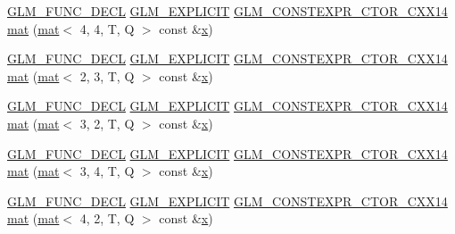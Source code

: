 \begin{DoxyCompactItemize}
\item 
\hyperlink{setup_8hpp_ab2d052de21a70539923e9bcbf6e83a51}{G\+L\+M\+\_\+\+F\+U\+N\+C\+\_\+\+D\+E\+CL} \hyperlink{setup_8hpp_a6c74f5a5e7b134ab69023ff9a30d4d5d}{G\+L\+M\+\_\+\+E\+X\+P\+L\+I\+C\+IT} \hyperlink{setup_8hpp_a0900f9145e68bf6061b6f5e7be3fa751}{G\+L\+M\+\_\+\+C\+O\+N\+S\+T\+E\+X\+P\+R\+\_\+\+C\+T\+O\+R\+\_\+\+C\+X\+X14} \hyperlink{structglm_1_1mat_3_012_00_014_00_01_t_00_01_q_01_4_a384e7c80499cdb6723c512a5cc7fef8d}{mat} (\hyperlink{structglm_1_1mat}{mat}$<$ 4, 4, T, Q $>$ const \&\hyperlink{_s_d_l__opengl_8h_ad0e63d0edcdbd3d79554076bf309fd47}{x})
\item 
\hyperlink{setup_8hpp_ab2d052de21a70539923e9bcbf6e83a51}{G\+L\+M\+\_\+\+F\+U\+N\+C\+\_\+\+D\+E\+CL} \hyperlink{setup_8hpp_a6c74f5a5e7b134ab69023ff9a30d4d5d}{G\+L\+M\+\_\+\+E\+X\+P\+L\+I\+C\+IT} \hyperlink{setup_8hpp_a0900f9145e68bf6061b6f5e7be3fa751}{G\+L\+M\+\_\+\+C\+O\+N\+S\+T\+E\+X\+P\+R\+\_\+\+C\+T\+O\+R\+\_\+\+C\+X\+X14} \hyperlink{structglm_1_1mat_3_012_00_014_00_01_t_00_01_q_01_4_aa1301eedf68cdda9f6f21e81d6fde7c0}{mat} (\hyperlink{structglm_1_1mat}{mat}$<$ 2, 3, T, Q $>$ const \&\hyperlink{_s_d_l__opengl_8h_ad0e63d0edcdbd3d79554076bf309fd47}{x})
\item 
\hyperlink{setup_8hpp_ab2d052de21a70539923e9bcbf6e83a51}{G\+L\+M\+\_\+\+F\+U\+N\+C\+\_\+\+D\+E\+CL} \hyperlink{setup_8hpp_a6c74f5a5e7b134ab69023ff9a30d4d5d}{G\+L\+M\+\_\+\+E\+X\+P\+L\+I\+C\+IT} \hyperlink{setup_8hpp_a0900f9145e68bf6061b6f5e7be3fa751}{G\+L\+M\+\_\+\+C\+O\+N\+S\+T\+E\+X\+P\+R\+\_\+\+C\+T\+O\+R\+\_\+\+C\+X\+X14} \hyperlink{structglm_1_1mat_3_012_00_014_00_01_t_00_01_q_01_4_a2a0d716cec87a87b5009e05f0f448633}{mat} (\hyperlink{structglm_1_1mat}{mat}$<$ 3, 2, T, Q $>$ const \&\hyperlink{_s_d_l__opengl_8h_ad0e63d0edcdbd3d79554076bf309fd47}{x})
\item 
\hyperlink{setup_8hpp_ab2d052de21a70539923e9bcbf6e83a51}{G\+L\+M\+\_\+\+F\+U\+N\+C\+\_\+\+D\+E\+CL} \hyperlink{setup_8hpp_a6c74f5a5e7b134ab69023ff9a30d4d5d}{G\+L\+M\+\_\+\+E\+X\+P\+L\+I\+C\+IT} \hyperlink{setup_8hpp_a0900f9145e68bf6061b6f5e7be3fa751}{G\+L\+M\+\_\+\+C\+O\+N\+S\+T\+E\+X\+P\+R\+\_\+\+C\+T\+O\+R\+\_\+\+C\+X\+X14} \hyperlink{structglm_1_1mat_3_012_00_014_00_01_t_00_01_q_01_4_a726436b31fe41cc71648e90591ad1d03}{mat} (\hyperlink{structglm_1_1mat}{mat}$<$ 3, 4, T, Q $>$ const \&\hyperlink{_s_d_l__opengl_8h_ad0e63d0edcdbd3d79554076bf309fd47}{x})
\item 
\hyperlink{setup_8hpp_ab2d052de21a70539923e9bcbf6e83a51}{G\+L\+M\+\_\+\+F\+U\+N\+C\+\_\+\+D\+E\+CL} \hyperlink{setup_8hpp_a6c74f5a5e7b134ab69023ff9a30d4d5d}{G\+L\+M\+\_\+\+E\+X\+P\+L\+I\+C\+IT} \hyperlink{setup_8hpp_a0900f9145e68bf6061b6f5e7be3fa751}{G\+L\+M\+\_\+\+C\+O\+N\+S\+T\+E\+X\+P\+R\+\_\+\+C\+T\+O\+R\+\_\+\+C\+X\+X14} \hyperlink{structglm_1_1mat_3_012_00_014_00_01_t_00_01_q_01_4_aecf5df0e023b0cd4d0f6f0e6ac9f9d3f}{mat} (\hyperlink{structglm_1_1mat}{mat}$<$ 4, 2, T, Q $>$ const \&\hyperlink{_s_d_l__opengl_8h_ad0e63d0edcdbd3d79554076bf309fd47}{x})

\end{DoxyCompactItemize}
